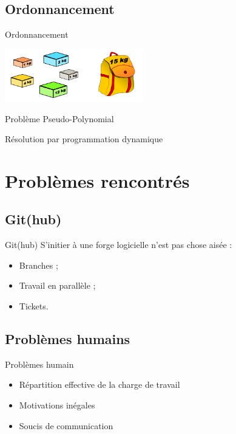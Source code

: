 \documentclass[xcolor=dvipsnames]{beamer}
\begin{document}
	\subsection{Ordonnancement}
		\begin{frame}{Ordonnancement}
\begin{center}
                \includegraphics[width=6cm]{images/knapsack.png}
\end{center}
                \begin{description}\itemsep15pt
                    \item Problème Pseudo-Polynomial
                    \item Résolution par programmation dynamique
                \end{description}

		\end{frame}

\section{Problèmes rencontrés}
\subsection{Git(hub)}
	\begin{frame}{Git(hub)}
	    S'initier à une forge logicielle n'est pas chose aisée :
		\begin{itemize}
		\setlength{\itemsep}{0.5cm}
			\item Branches ;
			\item Travail en parallèle ;
			\item Tickets.
		\end{itemize}
	\end{frame}
\subsection{Problèmes humains}
	\begin{frame}{Problèmes humain}
	    \begin{itemize}
		\setlength{\itemsep}{1cm}
	        \item Répartition effective de la charge de travail
	        \item Motivations inégales
	        \item Soucis de communication
        \end{itemize}
	\end{frame}
\end{document}
